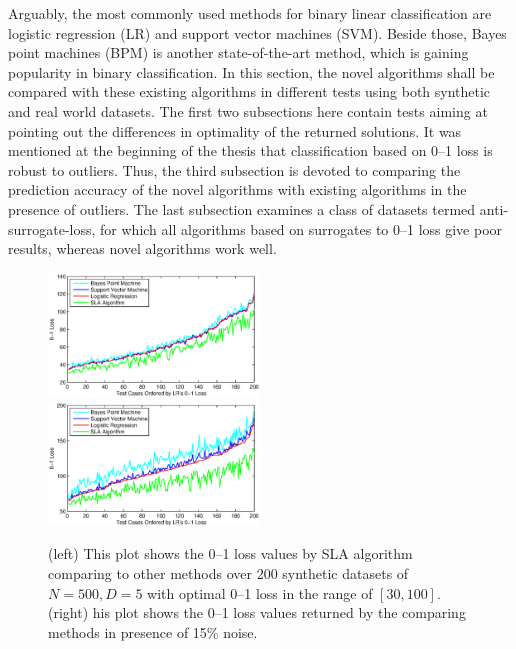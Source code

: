 Arguably, the most commonly used methods for binary linear
classification are logistic regression (LR) and support vector
machines (SVM). Beside those, Bayes point machines (BPM) is another
state-of-the-art method, which is gaining popularity in binary
classification. In this section, the novel algorithms shall be
compared with these existing algorithms in different tests using both
synthetic and real world datasets. The first two subsections here
contain tests aiming at pointing out the differences in optimality of
the returned solutions. It was mentioned at the beginning of the
thesis that classification based on 0--1 loss is robust to
outliers. Thus, the third subsection is devoted to comparing the
prediction accuracy of the novel algorithms with existing algorithms
in the presence of outliers. The last subsection examines a class of
datasets termed anti-surrogate-loss, for which all algorithms based on
surrogates to 0--1 loss give poor results, whereas novel algorithms
work well.



\begin{figure}[ht!]
\includegraphics[width=0.50\textwidth]{images/fig61_621a.eps}
\includegraphics[width=0.50\textwidth]{images/fig61_621b.eps}
\caption{ (left) This plot shows the 0--1 loss values by SLA algorithm
  comparing to other methods over 200 synthetic datasets of $N=500,
  D=5$ with optimal 0--1 loss in the range of $[30, 100]$.  
  (right) his plot shows the 0--1 loss values returned by the
  comparing methods in presence of 15\% noise.}
\label{fig:621a}
\end{figure}

